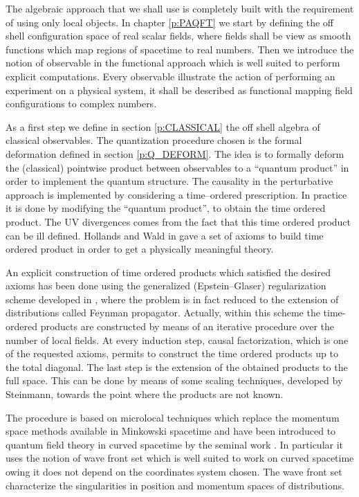 \documentclass[11pt]{book}
\theoremstyle{break}
\begin{document}
The algebraic approach that we shall use is completely built with the requirement of using only local objects. In chapter \ref{p:PAQFT} we start by defining the off shell configuration space of real scalar fields, where fields shall be view as smooth functions which map regions of spacetime to real numbers. Then we introduce the notion of observable in the functional approach which is well suited to perform explicit computations. Every observable illustrate the action of performing an experiment on a physical system, it shall be described as functional mapping field configurations to complex numbers. 


As a first step we define in section \ref{p:CLASSICAL} the off shell algebra of classical observables. The quantization procedure chosen is the formal deformation defined in section \ref{p:Q_DEFORM}. The idea is to formally deform the (classical) pointwise product between observables to a ``quantum product'' in order to implement the quantum structure. The causality in the perturbative approach is implemented by considering a time--ordered prescription. In practice it is done by modifying the ``quantum product'', to obtain the time ordered product. The UV divergences comes from the fact that this time ordered product can be ill defined. Hollands and Wald in \cite{HW_2001,HW_2002,HW_2005} gave a set of axioms to build time ordered product in order to get a physically meaningful theory. 


An explicit construction of time ordered products which satisfied the desired axioms has been done using the generalized (Epstein--Glaser) regularization scheme developed in \cite{BF_2000,HW_2001,HW_2005}, where the problem is in fact reduced to the extension of distributions called Feynman propagator. Actually, within this scheme the time-ordered products are constructed by means of an iterative procedure over the number of local fields. At every induction step, causal factorization, which is one of the requested axioms, permits to construct the time ordered products up to the total diagonal. The last step is the extension of the obtained products to the full space. This can be done by means of some scaling techniques, developed by Steinmann, towards the point where the products are not known.


The procedure is based on microlocal techniques which replace the momentum space methods available in Minkowski spacetime and have been introduced to quantum field theory in curved spacetime by the seminal work \cite{RADZIKOWSKI_1996}. In particular it uses the notion of wave front set which is well suited to work on curved spacetime owing it does not depend on the coordinates system chosen. The wave front set characterize the singularities in position and momentum spaces of distributions.\par%
\end{document}
